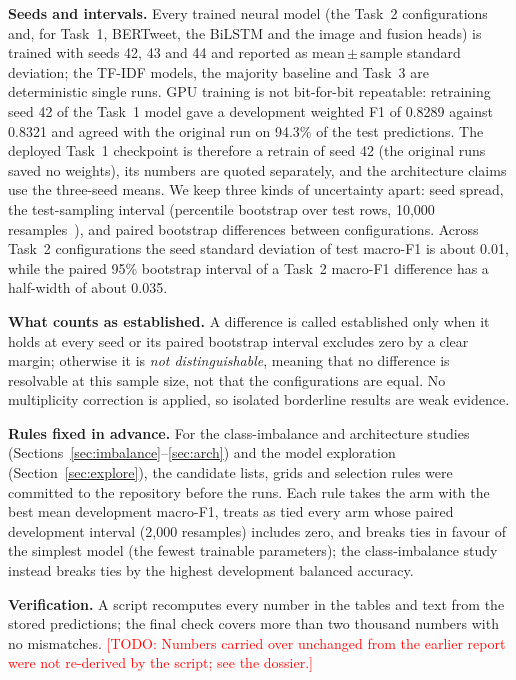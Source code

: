 \documentclass[conference]{IEEEtran}
\newcommand{\todo}[1]{\textcolor{red}{[TODO: #1]}}
\begin{document}
\textbf{Seeds and intervals.} Every trained neural model (the Task~2 configurations and, for Task~1, BERTweet, the BiLSTM and the image and fusion heads) is trained with seeds 42, 43 and 44 and reported as mean\,$\pm$\,sample standard deviation; the TF-IDF models, the majority baseline and Task~3 are deterministic single runs. GPU training is not bit-for-bit repeatable: retraining seed 42 of the Task~1 model gave a development weighted F1 of 0.8289 against 0.8321 and agreed with the original run on 94.3\% of the test predictions. The deployed Task~1 checkpoint is therefore a retrain of seed 42 (the original runs saved no weights), its numbers are quoted separately, and the architecture claims use the three-seed means. We keep three kinds of uncertainty apart: seed spread, the test-sampling interval (percentile bootstrap over test rows, 10,000 resamples~\cite{efron1993}), and paired bootstrap differences between configurations. Across Task~2 configurations the seed standard deviation of test macro-F1 is about 0.01, while the paired 95\% bootstrap interval of a Task~2 macro-F1 difference has a half-width of about 0.035.

\textbf{What counts as established.} A difference is called established only when it holds at every seed or its paired bootstrap interval excludes zero by a clear margin; otherwise it is \emph{not distinguishable}, meaning that no difference is resolvable at this sample size, not that the configurations are equal. No multiplicity correction is applied, so isolated borderline results are weak evidence.

\textbf{Rules fixed in advance.} For the class-imbalance and architecture studies (Sections~\ref{sec:imbalance}--\ref{sec:arch}) and the model exploration (Section~\ref{sec:explore}), the candidate lists, grids and selection rules were committed to the repository before the runs. Each rule takes the arm with the best mean development macro-F1, treats as tied every arm whose paired development interval (2,000 resamples) includes zero, and breaks ties in favour of the simplest model (the fewest trainable parameters); the class-imbalance study instead breaks ties by the highest development balanced accuracy.

\textbf{Verification.} A script recomputes every number in the tables and text from the stored predictions; the final check covers more than two thousand numbers with no mismatches. %
\todo{Numbers carried over unchanged from the earlier report were not re-derived by the script; see the dossier.}
\end{document}
